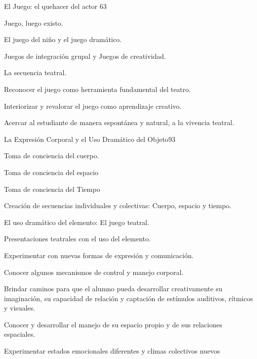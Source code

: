 \begin{syllabus}
\begin{unit}{El Juego: el  quehacer del actor }{}{6}{3}
\begin{topics}
	\item Juego, luego existo.
	\item El juego del niño y el juego dramático.
	\item Juegos de integración grupal y Juegos de creatividad.
	\item La secuencia teatral.
\end{topics}
\begin{learningoutcomes}
	\item Reconocer el juego como herramienta fundamental del teatro.
	\item Interiorizar y revalorar el juego como aprendizaje creativo.
	\item Acercar al estudiante de manera espontánea y natural, a la vivencia teatral.
\end{learningoutcomes}
\end{unit}

\begin{unit}{La Expresión Corporal y el Uso Dramático del Objeto}{}{9}{3}
\begin{topics}
	\item Toma de conciencia del cuerpo.
	\item Toma de conciencia del espacio
	\item Toma de conciencia del Tiempo
	\item Creación de secuencias individuales y colectivas: Cuerpo, espacio y tiempo.
	\item El uso dramático del elemento: El juego teatral.
	\item Presentaciones teatrales con el uso del elemento.

\end{topics}
\begin{learningoutcomes}
	\item Experimentar con nuevas formas de expresión y comunicación.
	\item Conocer algunos mecanismos de control y manejo corporal.
	\item Brindar caminos para que el alumno pueda desarrollar creativamente su imaginación, su capacidad de relación  y captación de estímulos auditivos, rítmicos y visuales.
	\item Conocer y desarrollar el manejo de su espacio propio  y de sus  relaciones  espaciales.
	\item Experimentar  estados emocionales diferentes y climas  colectivos nuevos
\end{learningoutcomes}
\end{unit}


\end{syllabus}
